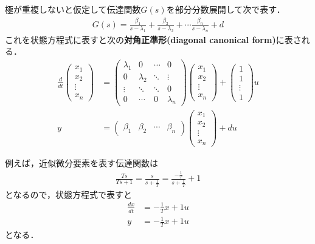 極が重複しないと仮定して伝達関数$G(s)$を部分分数展開して次で表す．
\begin{align}
 G(s) = \frac{\beta_1}{s-\lambda_1} + \frac{\beta_2}{s-\lambda_2} + \cdots 
        \frac{\beta_n}{s-\lambda_n} + d
\end{align}
これを状態方程式に表すと次の{\bf {対角正準形}(diagonal canonical form)}に表される．
\begin{align}
 \frac{d}{dt}
  \left(\begin{array}{c}
         x_1 \\
	 x_2 \\
	 \vdots \\
	 x_n
	\end{array}\right)
  &=
  \left(\begin{array}{cccc}
     \lambda_1 & 0         & \cdots & 0  \\
	 0         & \lambda_2 & \ddots & \vdots \\
	 \vdots    & \ddots    & \ddots & 0 \\
	 0         & \cdots    & 0      & \lambda_n
	\end{array}\right)
  \left(\begin{array}{c}
	 x_1 \\
	 x_2 \\
	 \vdots \\
	 x_n
	\end{array}\right)
  +
  \left(\begin{array}{c}
     1 \\
	 1 \\
	 \vdots \\
	 1
	\end{array}\right)
  u \label{eq:canoform_d}\\
y &=
 \left(\begin{array}{cccc}
        \beta_1 & \beta_2 & \cdots & \beta_{n}
       \end{array}\right)
 \left(\begin{array}{c}
        x_1 \\
	x_2 \\
	\vdots \\
	x_n
       \end{array}\right)
 + d u
\end{align}

例えば，近似微分要素を表す伝達関数は
\begin{align}
 \frac{Ts}{Ts+1} = \frac{s}{s+\frac{1}{T}}
 = \frac{-\frac{1}{T}}{s+\frac{1}{T}} + 1
\end{align}
となるので，状態方程式で表すと
\begin{align}
 \frac{dx}{dt} &= -\frac{1}{T} x + 1u \\
 y             &= -\frac{1}{T} x + 1u
\end{align}
となる．


